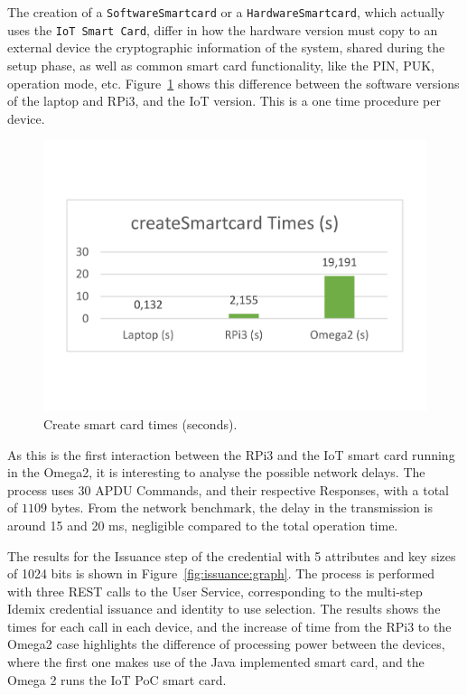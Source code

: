 The creation of a \texttt{SoftwareSmartcard} or a \texttt{HardwareSmartcard}, which actually uses the \texttt{IoT Smart Card}, differ in how the hardware version must copy to an external device the cryptographic information of the system, shared during the setup phase, as well as common smart card functionality, like the PIN, PUK, operation mode, etc. Figure~\ref{fig:createSmartCard:graph} shows this difference between the software versions of the laptop and RPi3, and the IoT version. This is a one time procedure per device.


\begin{figure}[bth]
	\centering
	\includegraphics[width=0.6\linewidth]{gfx/createSCGraph}
	\caption{Create smart card times (seconds).} 
	\label{fig:createSmartCard:graph} 
\end{figure}



As this is the first interaction between the RPi3 and the IoT smart card running in the Omega2, it is interesting to analyse the possible network delays. The process uses $30$ APDU Commands, and their respective Responses, with a total of $1109$ bytes. From the network benchmark, the delay in the transmission is around 15 and 20 ms, negligible compared to the total operation time.


\hfil

The results for the Issuance step of the credential with 5 attributes and key sizes of 1024 bits is shown in Figure~\ref{fig:issuance:graph}. The process is performed with three REST calls to the User Service, corresponding to the multi-step Idemix credential issuance and identity to use selection.  The results shows the times for each call in each device, and the increase of time from the RPi3 to the Omega2 case highlights the difference of processing power between the devices, where the first one makes use of the Java implemented smart card, and the Omega 2 runs the IoT PoC smart card.



